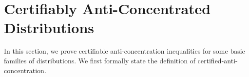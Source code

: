 










\section{Certifiably Anti-Concentrated Distributions} \label{sec:certified-anti-concentration}
In this section, we prove certifiable anti-concentration inequalities for some basic families of distributions. We first formally state the definition of certified-anti-concentration.

